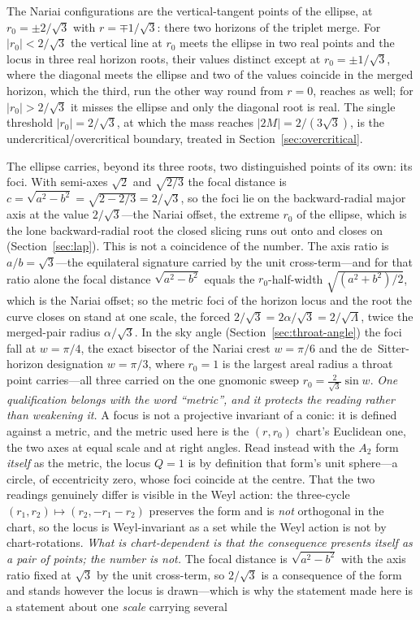 \documentclass[11pt,a4paper]{article}
\theoremstyle{definition}
\begin{document}
The Nariai configurations are the vertical-tangent points of the ellipse, at $r_{0}=\pm2/\sqrt{3}$ with $r=\mp1/\sqrt{3}$: there two horizons of the triplet merge. For $|r_{0}|<2/\sqrt{3}$ the vertical line at $r_{0}$ meets the ellipse in two real points and the locus in three real horizon roots, their values distinct except at $r_{0}=\pm1/\sqrt3$, where the diagonal meets the ellipse and two of the values coincide in the merged horizon, which the third, run the other way round from $r=0$, reaches as well; for $|r_{0}|>2/\sqrt{3}$ it misses the ellipse and only the diagonal root is real. The single threshold $|r_{0}|=2/\sqrt{3}$, at which the mass reaches $|2M|=2/(3\sqrt{3})$, is the undercritical/overcritical boundary, treated in Section~\ref{sec:overcritical}.

The ellipse carries, beyond its three roots, two distinguished points of its own: its foci. With semi-axes $\sqrt2$ and $\sqrt{2/3}$ the focal distance is $c=\sqrt{a^{2}-b^{2}}=\sqrt{2-2/3}=2/\sqrt3$, so the foci lie on the backward-radial major axis at the value $2/\sqrt3$---the Nariai offset, the extreme $r_{0}$ of the ellipse, which is the lone backward-radial root the closed slicing runs out onto and closes on (Section~\ref{sec:lap}). This is not a coincidence of the number. The axis ratio is $a/b=\sqrt3$---the equilateral signature carried by the unit cross-term---and for that ratio alone the focal distance $\sqrt{a^{2}-b^{2}}$ equals the $r_{0}$-half-width $\sqrt{(a^{2}+b^{2})/2}$, which is the Nariai offset; so the metric foci of the horizon locus and the root the curve closes on stand at one scale, the forced $2/\sqrt3=2\alpha/\sqrt3=2/\sqrt\Lambda$, twice the merged-pair radius $\alpha/\sqrt3$. In the sky angle (Section~\ref{sec:throat-angle}) the foci fall at $w=\pi/4$, the exact bisector of the Nariai crest $w=\pi/6$ and the de~Sitter-horizon designation $w=\pi/3$, where $r_{0}=1$ is the largest areal radius a throat point carries---all three carried on the one gnomonic sweep $r_{0}=\tfrac2{\sqrt3}\sin w$. \emph{One qualification belongs with the word ``metric'', and it protects the reading rather than weakening it.} A focus is not a projective invariant of a conic: it is defined against a metric, and the metric used here is the $(r,r_{0})$ chart's Euclidean one, the two axes at equal scale and at right angles. Read instead with the $A_{2}$ form \emph{itself} as the metric, the locus $Q=1$ is by definition that form's unit sphere---a circle, of eccentricity zero, whose foci coincide at the centre. That the two readings genuinely differ is visible in the Weyl action: the three-cycle $(r_{1},r_{2})\mapsto(r_{2},-r_{1}-r_{2})$ preserves the form and is \emph{not} orthogonal in the chart, so the locus is Weyl-invariant as a set while the Weyl action is not by chart-rotations. \emph{What is chart-dependent is that the consequence presents itself as a pair of points; the number is not.} The focal distance is $\sqrt{a^{2}-b^{2}}$ with the axis ratio fixed at $\sqrt3$ by the unit cross-term, so $2/\sqrt3$ is a consequence of the form and stands however the locus is drawn---which is why the statement made here is a statement about one \emph{scale} carrying several 
\end{document}
